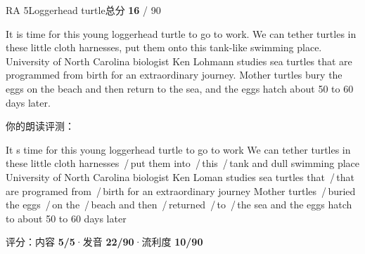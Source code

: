 \documentclass[11pt]{article}
\newcommand{\sfull}[1]{\textcolor{cFix}{\bfseries #1}}     %
\newcommand{\spart}[1]{\textcolor{cPartial}{\bfseries #1}} %
\newcommand{\szero}[1]{\textcolor{cWrong}{\bfseries #1}}   %
\newcommand{\sg}[1]{\textcolor{cSpkGood}{#1}}   %
\newcommand{\sy}[1]{\textcolor{cSpkOk}{#1}}     %
\newcommand{\sr}[1]{\textcolor{cSpkBad}{#1}}    %
\newcommand{\pse}{{\color{gray}\,/\,}}          %
\begin{document}
\begin{qblock}{RA 5\quad Loggerhead turtle}{总分 \textcolor{cAccent}{\bfseries 16} / 90}
\begin{promptbox}
It is time for this young loggerhead turtle to go to work. We can tether turtles in these little cloth harnesses, put them onto this tank-like swimming place. University of North Carolina biologist Ken Lohmann studies sea turtles that are programmed from birth for an extraordinary journey. Mother turtles bury the eggs on the beach and then return to the sea, and the eggs hatch about 50 to 60 days later.
\end{promptbox}
\smallskip\par{\footnotesize\color{gray}你的朗读评测：}
\begin{asrbox}
\sy{It s time for this young} \sy{loggerhead} \sg{turtle to go to work} \sg{We can} \sr{tether} \sg{turtles in these little} \sy{cloth harnesses} \pse \sy{put them into} \pse \sy{this} \pse \sy{tank and dull} \sg{swimming place University of} \sg{North Carolina biologist Ken Loman} \sg{studies} \sg{sea turtles that} \pse \sy{that are programed from} \pse \sg{birth for an} \sg{extraordinary journey Mother turtles} \pse \sy{buried the} \sg{eggs} \pse \sg{on the} \pse \sg{beach and then} \pse \sr{returned} \pse \sg{to} \pse \sg{the sea and the eggs hatch to} \sg{about 50 to 60 days later}
\end{asrbox}
{\small 评分：内容 \sfull{5/5}\quad·\quad 发音 \spart{22/90}\quad·\quad 流利度 \szero{10/90}}
\end{qblock}
\end{document}
